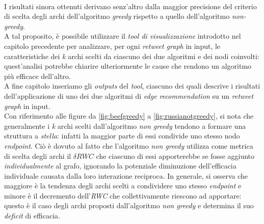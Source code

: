 \\I risultati sinora ottenuti derivano senz'altro dalla maggior precisione del criterio di scelta degli archi dell'algoritmo \textit{greedy} rispetto a quello dell'algoritmo \textit{non-greedy}. 
\\A tal proposito, è possibile utilizzare il \textit{tool di visualizzazione} introdotto nel capitolo precedente per analizzare, per ogni \textit{retweet graph} in input, le caratteristiche dei \textit{k} archi scelti da ciascuno dei due algoritmi e dei nodi coinvolti: quest'analisi potrebbe chiarire ulteriormente le cause che rendono un algoritmo più efficace dell'altro. 
\\A fine capitolo inseriamo gli \textit{outputs} del \textit{tool}, ciascuno dei quali descrive i risultati dell'applicazione di uno dei due algoritmi di \textit{edge recommendation} su un \textit{retweet graph} in input.
\\
Con riferimento alle figure da \ref{fig:beefgreedy} a \ref{fig:russianotgreedy}, si nota che generalmente i \textit{k} archi scelti dall'algoritmo \textit{non greedy} tendono a formare una struttura a \textit{stella}: infatti la maggior parte di essi condivide uno stesso nodo \textit{endpoint}. Ciò è dovuto al fatto che l'algoritmo \textit{non greedy} utilizza come metrica di scelta degli archi il \textit{$\delta RWC$} che ciascuno di essi apporterebbe se fosse aggiunto \textit{individualmente} al grafo, ignorando la potenziale diminuzione dell'efficacia individuale causata dalla loro interazione reciproca. In generale, si osserva che maggiore è la tendenza degli archi scelti a condividere uno stesso \textit{endpoint} e minore è il decremento dell'\textit{RWC} che collettivamente riescono ad apportare: questo è il caso degli archi proposti dall'algoritmo \textit{non greedy} e determina il suo \textit{deficit} di efficacia. 
